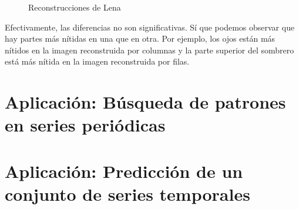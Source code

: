 \begin{figure}
 \centering
 \caption{Reconstrucciones de Lena}
 \label{f:comparativaFilas}
\end{figure}

Efectivamente, las diferencias no son significativas. Sí que podemos observar que hay partes más nítidas en una que en otra. Por ejemplo, los ojos están más nítidos en la imagen reconstruida por columnas y la parte superior del sombrero está más nítida en la imagen reconstruida por filas.\\





\section{Aplicación: Búsqueda de patrones en series periódicas}




\section{Aplicación: Predicción de un conjunto de series temporales}








%
